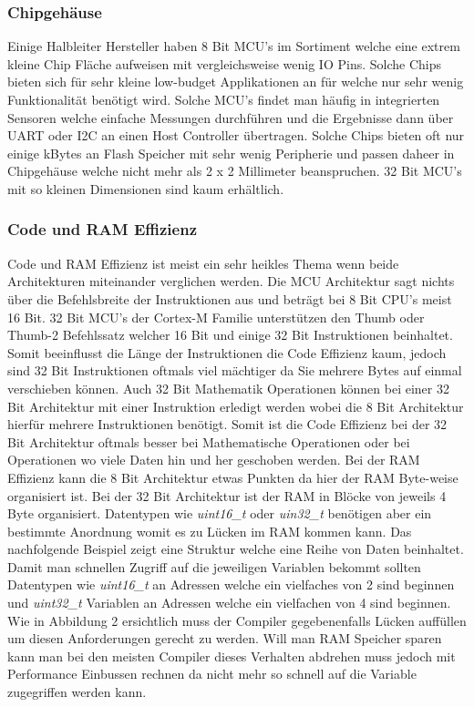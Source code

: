 \documentclass[MES,Master,ngerman]{twbook}%
\begin{document}
\subsubsection{Chipgehäuse}
Einige Halbleiter Hersteller haben 8 Bit MCU's im Sortiment welche eine extrem kleine Chip Fläche aufweisen mit vergleichsweise wenig IO Pins. Solche Chips bieten sich für sehr kleine low-budget Applikationen an für welche nur sehr wenig Funktionalität benötigt wird. Solche MCU's findet man häufig in integrierten Sensoren welche einfache Messungen durchführen und die Ergebnisse dann über UART oder I2C an einen Host Controller übertragen. Solche Chips bieten oft nur einige kBytes an Flash Speicher mit sehr wenig Peripherie und passen daheer in Chipgehäuse welche nicht mehr als 2 x 2 Millimeter beanspruchen. 32 Bit MCU's mit so kleinen Dimensionen sind kaum erhältlich. 
\subsubsection{Code und RAM Effizienz}
Code und RAM Effizienz ist meist ein sehr heikles Thema wenn beide Architekturen miteinander verglichen werden. Die MCU Architektur sagt nichts über die Befehlsbreite der Instruktionen aus und beträgt bei 8 Bit CPU's meist 16 Bit. 32 Bit MCU's der Cortex-M Familie unterstützen den Thumb oder Thumb-2 Befehlssatz welcher 16 Bit und einige 32 Bit Instruktionen beinhaltet. Somit beeinflusst die Länge der Instruktionen die Code Effizienz kaum, jedoch sind 32 Bit Instruktionen oftmals viel mächtiger da Sie mehrere Bytes auf einmal verschieben können. Auch 32 Bit Mathematik Operationen können bei einer 32 Bit Architektur mit einer Instruktion erledigt werden wobei die 8 Bit Architektur hierfür mehrere Instruktionen benötigt. Somit ist die Code Effizienz bei der 32 Bit Architektur oftmals besser bei Mathematische Operationen oder bei Operationen wo viele Daten hin und her geschoben werden. \newline
Bei der RAM Effizienz kann die 8 Bit Architektur etwas Punkten da hier der RAM Byte-weise organisiert ist. Bei der 32 Bit Architektur ist der RAM in Blöcke von jeweils 4 Byte organisiert. Datentypen wie \textit{uint16\_t} oder \textit{uin32\_t} benötigen aber ein bestimmte Anordnung womit es zu Lücken im RAM kommen kann. Das nachfolgende Beispiel zeigt eine Struktur welche eine Reihe von Daten beinhaltet. Damit man schnellen Zugriff auf die jeweiligen Variablen bekommt sollten Datentypen wie \textit{uint16\_t} an Adressen welche ein vielfaches von 2 sind beginnen und \textit{uint32\_t} Variablen an Adressen welche ein vielfachen von 4 sind beginnen. Wie in Abbildung 2 ersichtlich muss der Compiler gegebenenfalls Lücken auffüllen um diesen Anforderungen gerecht zu werden. Will man RAM Speicher sparen kann man bei den meisten Compiler dieses Verhalten abdrehen muss jedoch mit Performance Einbussen rechnen da nicht mehr so schnell auf die Variable zugegriffen werden kann.
\end{document}
